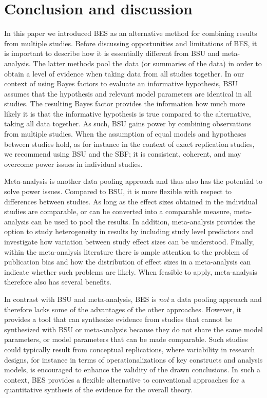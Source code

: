 \documentclass[11pt,reqno]{article}
\begin{document}
\section{Conclusion and discussion}
\label{Concl}

In this paper we introduced BES as an alternative method for combining results from multiple studies. 
Before discussing opportunities and limitations of BES, it is important to describe how it is essentially different from BSU and meta-analysis.
The latter methods pool the data (or summaries of the data) in order to obtain a level of evidence when taking data from all studies together. In our context of using Bayes factors to evaluate an informative hypothesis, BSU assumes that the hypothesis and relevant model parameters are identical in all studies. The resulting Bayes factor provides the information how much more likely it is that the informative hypothesis is true compared to the alternative, taking all data together. As such, BSU gains power by combining observations from multiple studies. When the assumption of equal models and hypotheses between studies hold, as for instance in the context of exact replication studies, we recommend using BSU and the SBF; it is consistent, coherent, and may overcome power issues in individual studies.

Meta-analysis is another data pooling approach and thus also has the potential to solve power issues.
Compared to BSU, it is more flexible with respect to differences between studies. 
As long as the effect sizes obtained in the individual studies are comparable, or can be converted into a comparable measure, meta-analysis can be used to pool the results.
In addition, meta-analysis provides the option to study heterogeneity in results by including study level predictors and investigate how variation between study effect sizes can be understood. Finally, within the meta-analysis literature there is ample attention to the problem of publication bias and how the distribution of effect sizes in a meta-analysis can indicate whether such problems are likely. When feasible to apply, meta-analysis therefore also has several benefits. 

In contrast with BSU and meta-analysis, BES is \emph{not} a data pooling approach and therefore lacks some of the advantages of the other approaches. However, it provides a tool that can synthesize evidence from studies that cannot be synthesized with BSU or meta-analysis because they do not share the same model parameters, or model parameters that can be made comparable. Such studies could typically result from conceptual replications, where variability in research designs, for instance in terms of operationalizations of key constructs and analysis models, is encouraged to enhance the validity of the drawn conclusions. In such a context, BES provides a flexible alternative to conventional approaches for a quantitative synthesis of the evidence for the overall theory.
\end{document}

